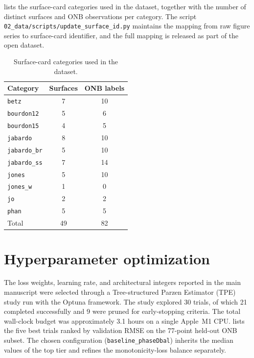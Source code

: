 \documentclass[11pt, a4paper]{article}
\begin{document}
 lists the surface-card categories
used in the dataset, together with the number of distinct surfaces and
ONB observations per category. The script
\verb|02_data/scripts/update_surface_id.py| maintains the mapping from
raw figure series to surface-card identifier, and the full mapping is
released as part of the open dataset.

\begin{table}[ht]
\centering
\caption{Surface-card categories used in the dataset.}
\label{tab:supp_surface_inventory}
\small
\begin{tabular}{lcc}
\toprule
Category & Surfaces & ONB labels \\
\midrule
\texttt{betz}        &  7 & 10 \\
\texttt{bourdon12}   &  5 &  6 \\
\texttt{bourdon15}   &  4 &  5 \\
\texttt{jabardo}     &  8 & 10 \\
\texttt{jabardo\_br} &  5 & 10 \\
\texttt{jabardo\_ss} &  7 & 14 \\
\texttt{jones}       &  5 & 10 \\
\texttt{jones\_w}    &  1 &  0 \\
\texttt{jo}          &  2 &  2 \\
\texttt{phan}        &  5 &  5 \\
\midrule
Total                & 49 & 82 \\
\bottomrule
\end{tabular}
\end{table}

\section{Hyperparameter optimization}\label{sec:supp_hpo}

The loss weights, learning rate, and architectural integers reported in
the main manuscript were selected through a Tree-structured Parzen
Estimator (TPE) study run with the Optuna framework. The study explored
\num{30} trials, of which \num{21} completed successfully and \num{9}
were pruned for early-stopping criteria. The total wall-clock budget
was approximately \num{3.1} hours on a single Apple~M1 CPU.
 lists the five best trials ranked by
validation RMSE on the \num{77}-point held-out ONB subset. The chosen
configuration (\texttt{baseline\_phaseDbal}) inherits the median values
of the top tier and refines the monotonicity-loss balance separately.
\end{document}
